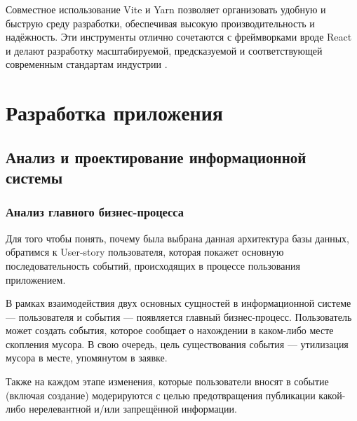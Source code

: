 \documentclass[diploma]{SCWorks}
\begin{document}
Совместное использование Vite и Yarn позволяет организовать удобную и быструю 
среду разработки, обеспечивая высокую производительность и надёжность. 
Эти инструменты отлично сочетаются с фреймворками вроде React и делают 
разработку масштабируемой, предсказуемой и соответствующей современным 
стандартам индустрии \cite{vite,yarn}.

\section{Разработка приложения}

\subsection{Анализ и проектирование информационной системы}

\subsubsection{Анализ главного бизнес-процесса}

Для того чтобы понять, почему была выбрана данная архитектура базы данных, 
обратимся к User-story пользователя, которая покажет основную последовательность
событий, происходящих в процессе пользования приложением.

В рамках взаимодействия двух основных сущностей в информационной системе — 
пользователя и события — появляется главный бизнес-процесс. Пользователь может 
создать события, которое сообщает о нахождении в каком-либо месте скопления 
мусора. В свою очередь, цель существования события — утилизация мусора в 
месте, упомянутом в заявке.

Также на каждом этапе изменения, которые пользователи вносят в событие 
(включая создание) модерируются с целью предотвращения публикации какой-либо
нерелевантной и/или запрещённой информации.
\end{document}
